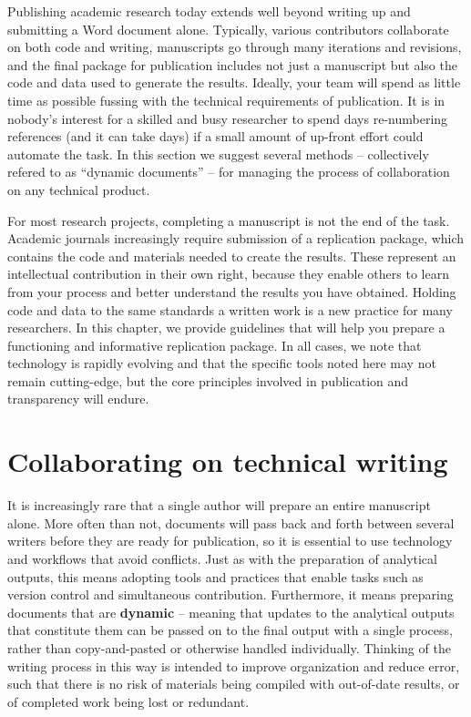 
\begin{fullwidth}
Publishing academic research today extends well beyond writing up and submitting a Word document alone.
Typically, various contributors collaborate on both code and writing,
manuscripts go through many iterations and revisions,
and the final package for publication includes not just a manuscript
but also the code and data used to generate the results.
Ideally, your team will spend as little time as possible
fussing with the technical requirements of publication.
It is in nobody's interest for a skilled and busy researcher
to spend days re-numbering references (and it can take days)
if a small amount of up-front effort could automate the task.
In this section we suggest several methods --
collectively refered to as ``dynamic documents'' --
for managing the process of collaboration on any technical product.

For most research projects, completing a manuscript is not the end of the task.
Academic journals increasingly require submission of a replication package,
which contains the code and materials needed to create the results.
These represent an intellectual contribution in their own right,
because they enable others to learn from your process
and better understand the results you have obtained.
Holding code and data to the same standards a written work
is a new practice for many researchers.
In this chapter, we provide guidelines that will help you
prepare a functioning and informative replication package.
In all cases, we note that technology is rapidly evolving
and that the specific tools noted here may not remain cutting-edge,
but the core principles involved in publication and transparency will endure.
\end{fullwidth}


\section{Collaborating on technical writing}

It is increasingly rare that a single author will prepare an entire manuscript alone.
More often than not, documents will pass back and forth between several writers
before they are ready for publication,
so it is essential to use technology and workflows that avoid conflicts.
Just as with the preparation of analytical outputs,
this means adopting tools and practices that enable tasks
such as version control and simultaneous contribution.
Furthermore, it means preparing documents that are \textbf{dynamic} --
meaning that updates to the analytical outputs that constitute them
can be passed on to the final output with a single process,
rather than copy-and-pasted or otherwise handled individually.
Thinking of the writing process in this way
is intended to improve organization and reduce error,
such that there is no risk of materials being compiled
with out-of-date results, or of completed work being lost or redundant.


